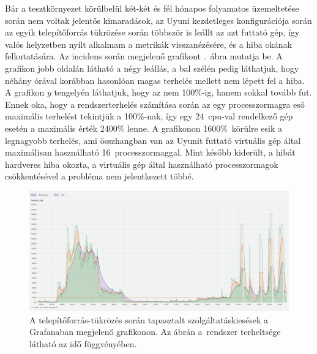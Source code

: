 Bár a tesztkörnyezet körülbelül két-két és fél hónapos folyamatos üzemeltetése során nem voltak jelentős kimaradások, az Uyuni kezdetleges konfigurációja során az egyik telepítőforrás tükrözése során többször is leállt az azt futtató gép, így valós helyzetben nyílt alkalmam a metrikák visszanézésére, és a hiba okának felkutatására. Az incidens során megjelenő grafikont .~ábra mutatja be. A grafikon jobb oldalán látható a négy leállás, a bal szélén pedig láthatjuk, hogy néhány órával korábban hasonlóan magas terhelés mellett nem lépett fel a hiba. A grafikon $ y $ tengelyén láthatjuk, hogy az nem 100\%-ig, hanem sokkal tovább fut. Ennek oka, hogy a rendszerterhelés számítása során az egy processzormagra eső maximális terhelést tekintjük a 100\%-nak, így egy 24~\acrshort{cpu}-val rendelkező gép esetén a maximális érték 2400\% lenne. A grafikonon 1600\%~körülre esik a legnagyobb terhelés, ami összhangban van az Uyunit futtató virtuális gép által maximálisan használható 16~processzormaggal. Mint később kiderült, a hibát hardveres hiba okozta, a virtuális gép által használható processzormagok csökkentésével a probléma nem jelentkezett többé.

\begin{figure}[h!t]
	\centering
	\includegraphics[width=15cm]{figures/reboot-grafana-invert.jpg}
	\caption{A telepítőforrás-tükrözés során tapasztalt szolgáltatáskiesések a Grafanaban megjelenő grafikonon. Az ábrán a~rendszer terheltsége látható az idő függvényében.}
	\label{fig:reboot-grafana}
\end{figure}
